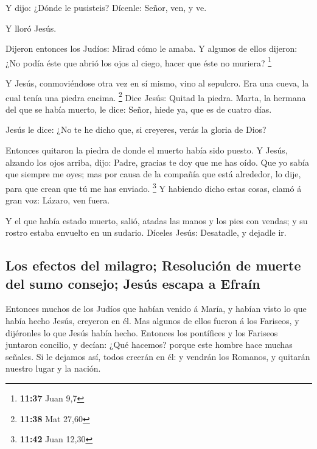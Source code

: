  Y dijo: ¿Dónde le pusisteis? Dícenle: Señor, ven, y ve.

 Y lloró Jesús.

 Dijeron entonces los Judíos: Mirad cómo le amaba.
 Y algunos de ellos dijeron: ¿No podía éste que abrió los
ojos al ciego, hacer que éste no muriera? \footnote{\textbf{11:37} Juan
  9,7}

 Y Jesús, conmoviéndose otra vez en sí mismo, vino al
sepulcro. Era una cueva, la cual tenía una piedra encima. \footnote{\textbf{11:38}
  Mat 27,60}  Dice Jesús: Quitad la piedra. Marta, la
hermana del que se había muerto, le dice: Señor, hiede ya, que es de
cuatro días.

 Jesús le dice: ¿No te he dicho que, si creyeres, verás
la gloria de Dios?

 Entonces quitaron la piedra de donde el muerto había
sido puesto. Y Jesús, alzando los ojos arriba, dijo: Padre, gracias te
doy que me has oído.  Que yo sabía que siempre me oyes;
mas por causa de la compañía que está alrededor, lo dije, para que crean
que tú me has enviado. \footnote{\textbf{11:42} Juan 12,30}
 Y habiendo dicho estas cosas, clamó á gran voz: Lázaro,
ven fuera.

 Y el que había estado muerto, salió, atadas las manos y
los pies con vendas; y su rostro estaba envuelto en un sudario. Díceles
Jesús: Desatadle, y dejadle ir.

\hypertarget{los-efectos-del-milagro-resoluciuxf3n-de-muerte-del-sumo-consejo-jesuxfas-escapa-a-efrauxedn}{%
\subsection{Los efectos del milagro; Resolución de muerte del sumo
consejo; Jesús escapa a
Efraín}\label{los-efectos-del-milagro-resoluciuxf3n-de-muerte-del-sumo-consejo-jesuxfas-escapa-a-efrauxedn}}

 Entonces muchos de los Judíos que habían venido á María,
y habían visto lo que había hecho Jesús, creyeron en él. 
Mas algunos de ellos fueron á los Fariseos, y dijéronles lo que Jesús
había hecho.  Entonces los pontífices y los Fariseos
juntaron concilio, y decían: ¿Qué hacemos? porque este hombre hace
muchas señales.  Si le dejamos así, todos creerán en él:
y vendrán los Romanos, y quitarán nuestro lugar y la nación.

